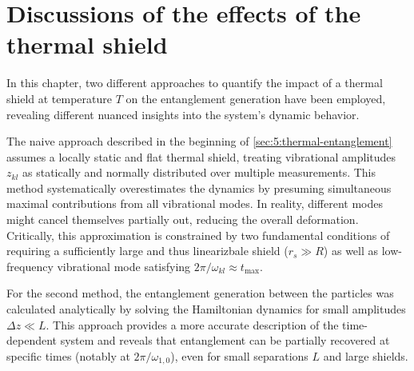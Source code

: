 \section{Discussions of the effects of the thermal shield} \label{sec:5:discussion}

In this chapter, two different approaches to quantify the impact of a thermal shield at temperature $T$ on the entanglement generation have been employed, revealing different nuanced insights into the system's dynamic behavior.

The naive approach described in the beginning of \cref{sec:5:thermal-entanglement} assumes a locally static and flat thermal shield, treating vibrational amplitudes $z_{kl}$ as statically and normally distributed over multiple measurements.
This method systematically overestimates the dynamics by presuming simultaneous maximal contributions from all vibrational modes.
In reality, different modes might cancel themselves partially out, reducing the overall deformation.
Critically, this approximation is constrained by two fundamental conditions of requiring a sufficiently large and thus linearizbale shield ($r_s \gg R$) as well as low-frequency vibrational mode satisfying $2\pi/\omega_{kl} \approx t_\mathrm{max}$.

For the second method, the entanglement generation between the particles was calculated analytically by solving the Hamiltonian dynamics for small amplitudes $\Delta z \ll L$. This approach provides a more accurate description of the time-dependent system and reveals that entanglement can be partially recovered at specific times (notably at $2\pi/\omega_{1,0}$), even for small separations $L$ and large shields.

